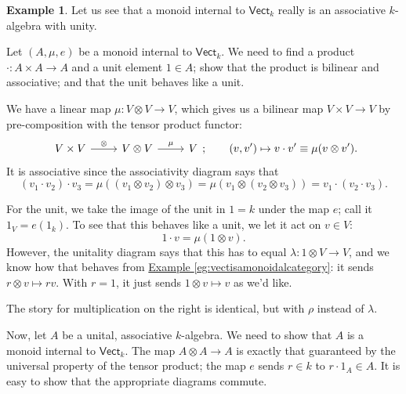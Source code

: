 \documentclass[a4paper,10pt]{scrreprt}
\theoremstyle{definition}
\newtheorem{example}{Example}[section]
\theoremstyle{plain}
\theoremstyle{remark}
\begin{document}
\begin{example}
  \label{eg:algebrasaremonoidsinternaltovect}
  Let us see that a monoid internal to $\mathsf{Vect}_{k}$ really is an associative $k$-algebra with unity. 

  Let $(A, \mu, e)$ be a monoid internal to $\mathsf{Vect}_{k}$. We need to find a product $\cdot\colon A \times A \to A$ and a unit element $1 \in A$; show that the product is bilinear and associative; and that the unit behaves like a unit.

  We have a linear map $\mu\colon V \otimes V \to V$, which gives us a bilinear map $V \times V \to V$ by pre-composition with the tensor product functor:
  \begin{equation*}
    \begin{tikzcd}
      V \times V
      \arrow[r, "\otimes"]
      & V \otimes V
      \arrow[r, "\mu"]
      & V
    \end{tikzcd};
    \qquad
    (v, v') \mapsto v \cdot v' \equiv \mu(v \otimes v').
  \end{equation*}
  It is associative since the associativity diagram says that
  \begin{equation*}
    (v_{1} \cdot v_{2}) \cdot v_{3} = \mu((v_{1} \otimes v_{2}) \otimes v_{3}) = \mu(v_{1} \otimes (v_{2} \otimes v_{3})) = v_{1} \cdot (v_{2} \cdot v_{3}).
  \end{equation*}

  For the unit, we take the image of the unit in $1=k$ under the map $e$; call it $1_{V} = e(1_{k})$. To see that this behaves like a unit, we let it act on $v \in V$:
  \begin{equation*}
    1 \cdot v = \mu(1 \otimes v).
  \end{equation*}
  However, the unitality diagram says that this has to equal $\lambda\colon 1 \otimes V \to V$, and we know how that behaves from \hyperref[eg:vectisamonoidalcategory]{Example \ref*{eg:vectisamonoidalcategory}}: it sends $r \otimes v \mapsto rv$. With $r = 1$, it just sends $1 \otimes v \mapsto v$ as we'd like. 

  The story for multiplication on the right is identical, but with $\rho$ instead of $\lambda$.

  Now, let $A$ be a unital, associative $k$-algebra. We need to show that $A$ is a monoid internal to $\mathsf{Vect}_{k}$. The map $A \otimes A \to A$ is exactly that guaranteed by the universal property of the tensor product; the map $e$ sends $r \in k$ to $r\cdot 1_{A} \in A$. It is easy to show that the appropriate diagrams commute.
\end{example}  
\end{document}
